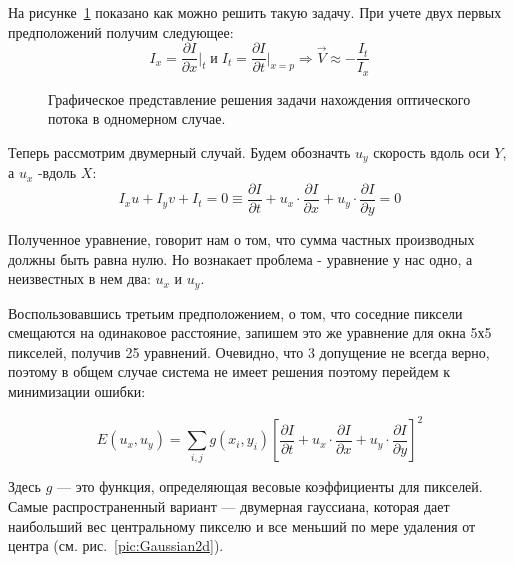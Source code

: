 На рисунке~\ref{pic:OptFlow1DSolve} показано как можно решить такую задачу. При учете двух первых предположений  получим следующее:
$$
I_x = \frac{\partial I}{\partial x} \Bigr|_t \; и \;
I_t = \frac{\partial I}{\partial t} \Bigr|_{x=p} \Rightarrow 
\vec{V} \approx - \frac{I_t}{I_x}
$$
\begin{figure}[!htb]
\caption{Графическое представление решения задачи нахождения оптического потока в одномерном случае.}
\label{pic:OptFlow1DSolve}
\end{figure}

Теперь рассмотрим двумерный случай. Будем обозначть $u_y$ скорость вдоль оси $Y$, а $u_x$ -вдоль $X$:
$$ I_xu +I_yv+I_t = 0 \equiv 
\frac{\partial I}{\partial t} + 
u_x \cdot \frac{\partial I}{\partial x} + 
u_y \cdot \frac{\partial I}{\partial y} = 0 
$$

Полученное уравнение, говорит нам о том, что сумма частных производных должны быть равна нулю. Но вознакает проблема - уравнение у нас одно, а неизвестных в нем два: $u_x$ и $u_y$.

Воспользовавшись третьим предположением, о том, что соседние пиксели смещаются на одинаковое расстояние, запишем это же уравнение для окна 5х5 пикселей, получив 25 уравнений. Очевидно, что 3 допущение не всегда верно, поэтому в общем случае система не имеет решения поэтому перейдем к минимизации ошибки:

$$
E(u_x, u_y) = \sum \limits_{i,j} g(x_i, y_i) 
\left[ \frac{\partial I}{\partial t} + 
u_x \cdot \frac{\partial I}{\partial x} + 
u_y \cdot \frac{\partial I}{\partial y} \right]^2
$$

Здесь $g$ — это функция, определяющая весовые коэффициенты для пикселей. Самые распространенный вариант — двумерная гауссиана, которая дает наибольший вес центральному пикселю и все меньший по мере удаления от центра (см. рис.~\ref{pic:Gaussian2d}).


